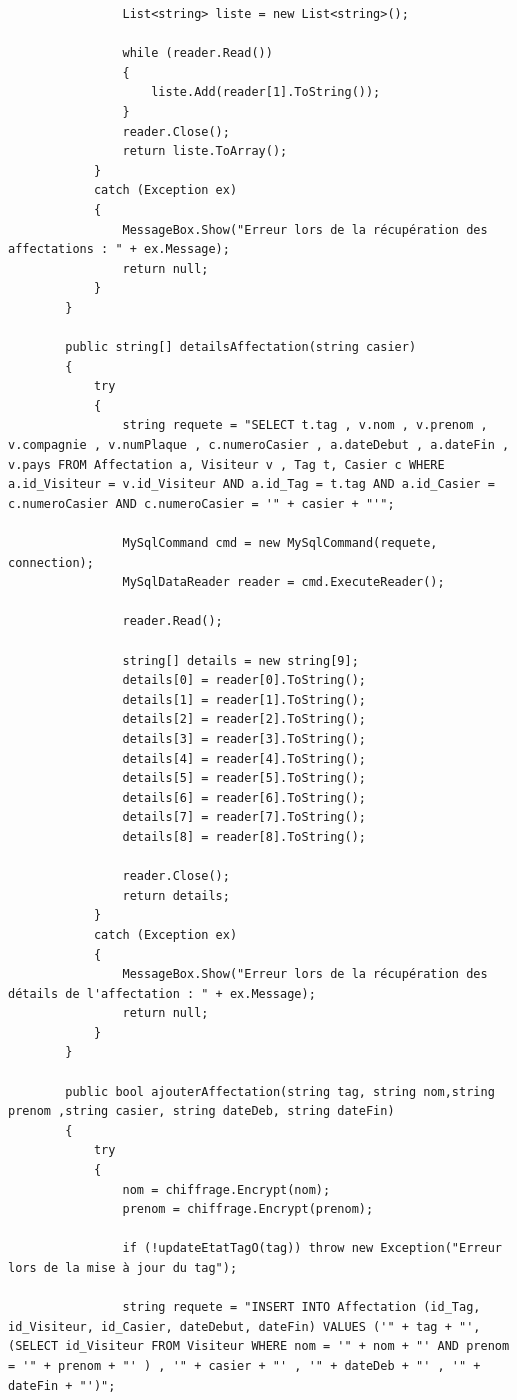 \documentclass[main.tex]{subfiles}
\begin{document}
\begin{lstlisting}
                List<string> liste = new List<string>();

                while (reader.Read())
                {
                    liste.Add(reader[1].ToString());
                }
                reader.Close();
                return liste.ToArray();
            }
            catch (Exception ex)
            {
                MessageBox.Show("Erreur lors de la récupération des affectations : " + ex.Message);
                return null;
            }
        }

        public string[] detailsAffectation(string casier)
        {
            try
            {
                string requete = "SELECT t.tag , v.nom , v.prenom , v.compagnie , v.numPlaque , c.numeroCasier , a.dateDebut , a.dateFin , v.pays FROM Affectation a, Visiteur v , Tag t, Casier c WHERE a.id_Visiteur = v.id_Visiteur AND a.id_Tag = t.tag AND a.id_Casier = c.numeroCasier AND c.numeroCasier = '" + casier + "'";

                MySqlCommand cmd = new MySqlCommand(requete, connection);
                MySqlDataReader reader = cmd.ExecuteReader();

                reader.Read();

                string[] details = new string[9];
                details[0] = reader[0].ToString();
                details[1] = reader[1].ToString();
                details[2] = reader[2].ToString();
                details[3] = reader[3].ToString();
                details[4] = reader[4].ToString();
                details[5] = reader[5].ToString();
                details[6] = reader[6].ToString();
                details[7] = reader[7].ToString();
                details[8] = reader[8].ToString();

                reader.Close();
                return details;
            }
            catch (Exception ex)
            {
                MessageBox.Show("Erreur lors de la récupération des détails de l'affectation : " + ex.Message);
                return null;
            }
        }

        public bool ajouterAffectation(string tag, string nom,string prenom ,string casier, string dateDeb, string dateFin)
        {
            try
            {
                nom = chiffrage.Encrypt(nom);
                prenom = chiffrage.Encrypt(prenom);

                if (!updateEtatTagO(tag)) throw new Exception("Erreur lors de la mise à jour du tag");

                string requete = "INSERT INTO Affectation (id_Tag, id_Visiteur, id_Casier, dateDebut, dateFin) VALUES ('" + tag + "', (SELECT id_Visiteur FROM Visiteur WHERE nom = '" + nom + "' AND prenom = '" + prenom + "' ) , '" + casier + "' , '" + dateDeb + "' , '" + dateFin + "')";


\end{lstlisting}
\end{document}
